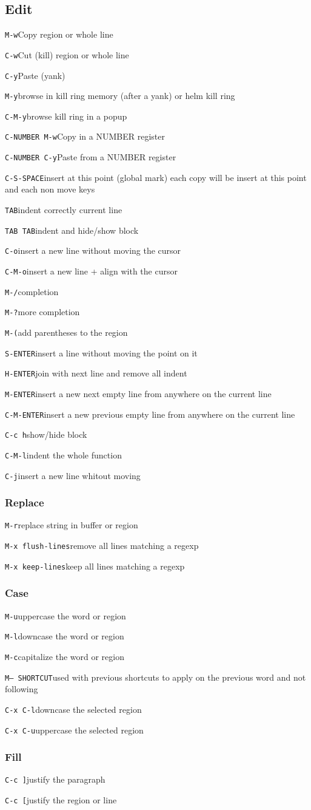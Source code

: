 \documentclass[10pt,landscape]{article}
\def\cm#1#2{{\tt#1}\dotfill#2\par}
\begin{document}
\begin{multicols}{3}
\subsection{Edit}
\cm{M-w}{Copy region or whole line}
\cm{C-w}{Cut (kill) region or whole line}
\cm{C-y}{Paste (yank)}
\cm{M-y}{browse in kill ring memory (after a yank) or helm kill ring}
\cm{C-M-y}{browse kill ring in a popup}
\cm{C-NUMBER M-w}{Copy in a NUMBER register}
\cm{C-NUMBER C-y}{Paste from a NUMBER register}
\cm{C-S-SPACE}{insert at this point (global mark) each copy will be insert at this point and each non move keys}
\cm{TAB}{indent correctly current line}
\cm{TAB TAB}{indent and hide/show block}
\cm{C-o}{insert a new line without moving the cursor}
\cm{C-M-o}{insert a new line + align with the cursor}
\cm{M-/}{completion}
\cm{M-?}{more completion}
\cm{M-(}{add parentheses to the region}
\cm{S-ENTER}{insert a line without moving the point on it}
\cm{H-ENTER}{join with next line and remove all indent}
\cm{M-ENTER}{insert a new next empty line from anywhere on the current line}
\cm{C-M-ENTER}{insert a new previous empty line from anywhere on the current line}
\cm{C-c h}{show/hide block}
\cm{C-M-l}{indent the whole function}
\cm{C-j}{insert a new line whitout moving}

\subsubsection{Replace}
\cm{M-r}{replace string in buffer or region}
\cm{M-x flush-lines}{remove all lines matching a regexp}
\cm{M-x keep-lines}{keep all lines matching a regexp}

\subsubsection{Case}
\cm{M-u}{uppercase the word or region}
\cm{M-l}{downcase the word or region}
\cm{M-c}{capitalize the word or region}
\cm{M-- SHORTCUT}{used with previous shortcuts to apply on the previous word and not following}
\cm{C-x C-l}{downcase the selected region}
\cm{C-x C-u}{uppercase the selected region}

\subsubsection{Fill}
\cm{C-c ]}{justify the paragraph}
\cm{C-c [}{justify the region or line}


\end{multicols}
\end{document}
